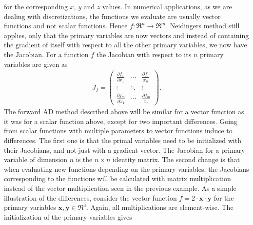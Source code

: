 for the corresponding $x$, $y$ and $z$ values. In numerical applications, as we are dealing with discretizations, the functions we evaluate are usually vector functions and not scalar functions. Hence $f: \Re^n \rightarrow \Re^m$. Neidingers method still applies, only that the primary variables are now vectors and instead of containing the gradient of itself with respect to all the other primary variables, we now have the Jacobian. For a function $f$ the Jacobian with respect to its $n$ primary variables are given as
\begin{align*}
    J_f  =
    \begin{pmatrix}
        \frac{\partial f_1}{\partial x_1} & \dotsb & \frac{\partial f_1}{x_n}\\
        \vdots & \ddots & \vdots \\
        \frac{\partial f_m}{\partial x_1} & \dotsb & \frac{\partial f_m}{x_n}
    \end{pmatrix}.
\end{align*}
The forward AD method described above will be similar for a vector function as it was for a scalar function above, except for two important differences. 
Going from scalar functions with multiple parameters to vector functions induce to differences. The first one is that the primal variables need to be initialized with their Jacobians, and not just with a gradient vector. The Jacobian for a primary variable of dimension $n$ is the $n \times n$ identity matrix. The second change is that when evaluating new functions depending on the primary variables, the Jacobians corresponding to the functions will be calculated with matrix multiplication instead of the vector multiplication seen in the previous example. As a simple illustration of the differences, consider the vector function $f = 2\cdot \textbf{x}\cdot \textbf{y}$ for the primary variables $\textbf{x},\textbf{y}\in \Re^3$. Again, all multiplications are element-wise. The initialization of the primary variables gives

